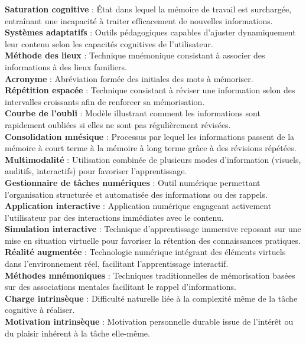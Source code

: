 \documentclass[12pt,a4paper]{report}
\begin{document}
\textbf{Saturation cognitive} : État dans lequel la mémoire de travail est surchargée, entraînant une incapacité à traiter efficacement de nouvelles informations.\\
\textbf{Systèmes adaptatifs} : Outils pédagogiques capables d'ajuster dynamiquement leur contenu selon les capacités cognitives de l’utilisateur.\\
\textbf{Méthode des lieux} : Technique mnémonique consistant à associer des informations à des lieux familiers.\\
\textbf{Acronyme} : Abréviation formée des initiales des mots à mémoriser.\\
\textbf{Répétition espacée} : Technique consistant à réviser une information selon des intervalles croissants afin de renforcer sa mémorisation.\\
\textbf{Courbe de l’oubli} : Modèle illustrant comment les informations sont rapidement oubliées si elles ne sont pas régulièrement révisées.\\
\textbf{Consolidation mnésique} : Processus par lequel les informations passent de la mémoire à court terme à la mémoire à long terme grâce à des révisions répétées.\\
\textbf{Multimodalité} : Utilisation combinée de plusieurs modes d’information (visuels, auditifs, interactifs) pour favoriser l'apprentissage.\\
\textbf{Gestionnaire de tâches numériques} : Outil numérique permettant l’organisation structurée et automatisée des informations ou des rappels.\\
\textbf{Application interactive} : Application numérique engageant activement l’utilisateur par des interactions immédiates avec le contenu.\\
\textbf{Simulation interactive} : Technique d'apprentissage immersive reposant sur une mise en situation virtuelle pour favoriser la rétention des connaissances pratiques.\\
\textbf{Réalité augmentée} : Technologie numérique intégrant des éléments virtuels dans l'environnement réel, facilitant l'apprentissage interactif.\\
\textbf{Méthodes mnémoniques} : Techniques traditionnelles de mémorisation basées sur des associations mentales facilitant le rappel d’informations.\\
\textbf{Charge intrinsèque} : Difficulté naturelle liée à la complexité même de la tâche cognitive à réaliser.\\
\textbf{Motivation intrinsèque} : Motivation personnelle durable issue de l'intérêt ou du plaisir inhérent à la tâche elle-même.\\
\end{document}
